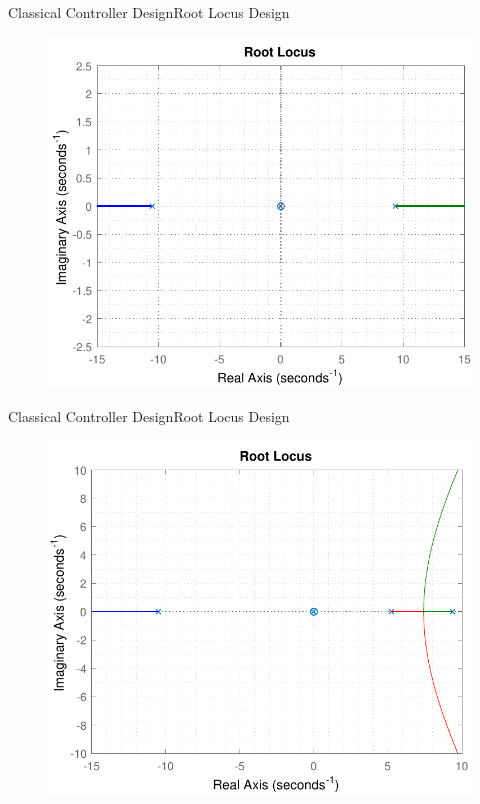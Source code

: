 \begin{frame}{Classical Controller Design}{Root Locus Design}	
	\begin{figure}
		\includegraphics[scale=.55]{Pictures/rlocusCubli}
		\centering
	\end{figure}
\end{frame}

\begin{frame}{Classical Controller Design}{Root Locus Design}	
	\begin{figure}
	\includegraphics[scale=.55]{Pictures/RLController1}
	\centering
	\end{figure}
\end{frame}

